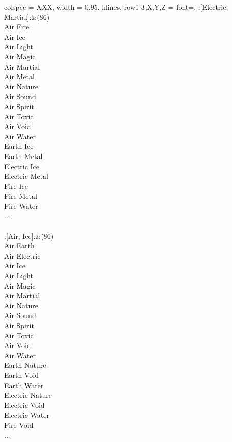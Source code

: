 \begin{longtblr}[
	caption = {2v2 Attacking Effective},
	label = {2v2-Attacking-Effective},
]{
	colspec = {XXX}, width = 0.95\linewidth,
	hlines,
	row{1-3,X,Y,Z} = {font=\bfseries},
}
	:[Electric, Martial]:&{(86)\\
	Air Fire \\
	Air Ice \\
	Air Light \\
	Air Magic \\
	Air Martial \\
	Air Metal \\
	Air Nature \\
	Air Sound \\
	Air Spirit \\
	Air Toxic \\
	Air Void \\
	Air Water \\
	Earth Ice \\
	Earth Metal \\
	Electric Ice \\
	Electric Metal \\
	Fire Ice \\
	Fire Metal \\
	Fire Water \\
	...\\
	}\\

	:[Air, Ice]:&{(86)\\
	Air Earth \\
	Air Electric \\
	Air Ice \\
	Air Light \\
	Air Magic \\
	Air Martial \\
	Air Nature \\
	Air Sound \\
	Air Spirit \\
	Air Toxic \\
	Air Void \\
	Air Water \\
	Earth Nature \\
	Earth Void \\
	Earth Water \\
	Electric Nature \\
	Electric Void \\
	Electric Water \\
	Fire Void \\
	...\\
	}\\


\end{longtblr}
